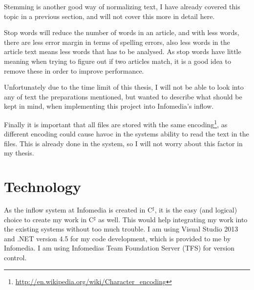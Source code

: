 Stemming is another good way of normalizing text, I have already covered this topic in a previous section, and will not cover this more in detail here. 

Stop words will reduce the number of words in an article, and with less words, there are less error margin in terms of spelling errors, also less words in the article text means less words that has to be analysed. As stop words have little meaning when trying to figure out if two articles match, it is a good idea to remove these in order to improve performance. 

Unfortunately due to the time limit of this thesis, I will not be able to look into any of text the preparations mentioned, but wanted to describe what should be kept in mind, when implementing this project into Infomedia's inflow.

Finally it is important that all files are stored with the same encoding\footnote{\url{http://en.wikipedia.org/wiki/Character_encoding}}, as different encoding could cause havoc in the systems ability to read the text in the files. This is already done in the system, so I will not worry about this factor in my thesis.

\section{Technology}
As the inflow system at Infomedia is created in C$^\sharp$, it is the easy (and logical) choice to create my work in C$^\sharp$ as well. This would help integrating my work into the existing systems without too much trouble. I am using Visual Studio 2013 and .NET version 4.5 for my code development, which is provided to me by Infomedia. I am using Infomedias Team Foundation Server (TFS) for version control. 








